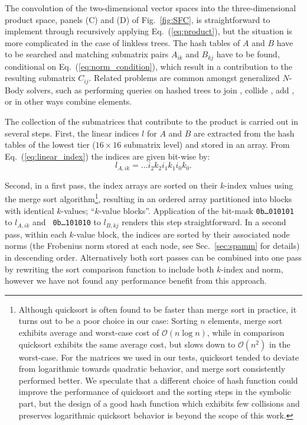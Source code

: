 The convolution of the two-dimensional vector spaces into the
three-dimensional product space, panels (C) and (D) of Fig.~\ref{fig:SFC}, is
straightforward to implement through recursively applying
Eq.~(\ref{eq:product}), but the situation is more complicated in the case of
linkless trees. The hash tables of $A$ and $B$ have to be searched and
matching submatrix pairs $A_{ik}$ and $B_{kj}$ have to be found, conditional
on Eq.~(\ref{eq:norm_condition}), which result in a contribution to the
resulting submatrix $C_{ij}$. Related problems are common amongst generalized
$N$-Body solvers, such as performing queries on hashed trees to join
\cite{Amossen:2009:SpMMeqJoin}, collide \cite{AVRIL:2009:HAL-00412870:1}, add
\cite{Warren:1995:HOT}, or in other ways combine elements.

The collection of the submatrices that contribute to the product is carried
out in several steps. First, the linear indices $l$ for $A$ and $B$ are
extracted from the hash tables of the lowest tier ($16 \times 16$ submatrix
level) and stored in an array. From Eq.~(\ref{eq:linear_index}) the indices
are given bit-wise by:
\begin{equation}
l_{A, ik} = \ldots i_{2} k_{2} i_{1} k_{1} i_{0} k_{0}.
\end{equation}

\noindent Second, in a first pass, the index arrays are sorted on their
$k$-index values using the merge sort algorithm\footnote{Although quicksort is
often found to be faster than merge sort in practice, it turns out to be a
poor choice in our case: Sorting $n$ elements, merge sort exhibits average and
worst-case cost of $\mathcal{O} \left(n \log n \right)$, while in comparison
quicksort exhibits the same average cost, but slows down to $\mathcal{O}
\left( n^{2} \right)$ in the worst-case. For the matrices we used in our
tests, quicksort tended to deviate from logarithmic towards quadratic
behavior, and merge sort consistently performed better.  We speculate that a
different choice of hash function could improve the performance of quicksort
and the sorting steps in the symbolic part, but the design of a good hash
function which exhibits few collisions and preserves logarithmic quicksort
behavior is beyond the scope of this work.}, resulting in an ordered array
partitioned into blocks with identical $k$-values; ``$k$-value blocks''.
Application of the bit-mask {\tt 0b\dots010101} to $l_{A, ik}$ and {\tt
0b\dots 101010} to $l_{B, kj}$ renders this step straightforward. In a second
pass, within each $k$-value block, the indices are sorted by their associated
node norms (the Frobenius norm stored at each node, see Sec.~\ref{sec:spamm}
for details) in descending order.  Alternatively both sort passes can be
combined into one pass by rewriting the sort comparison function to include
both $k$-index and norm, however we have not found any performance benefit
from this approach.


